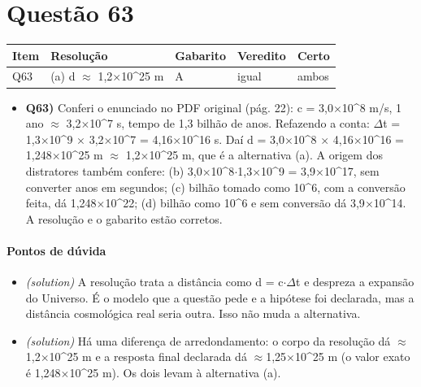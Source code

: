 \documentclass{article}%
\begin{document}
\section*{Questão 63}%
\begin{longtable}{@{}p{} p{} p{} p{} p{}@{}}\toprule Item & Resolução & Gabarito & Veredito & Certo \\ \midrule
Q63 & (a) d $\approx$ 1,2$\times$10\^{}25 m & A & igual & ambos \\
\bottomrule\end{longtable}%
\begin{itemize}%
\item%
\textbf{Q63)} Conferi o enunciado no PDF original (pág. 22): c = 3,0$\times$10\^{}8 m/s, 1 ano $\approx$ 3,2$\times$10\^{}7 s, tempo de 1,3 bilhão de anos. Refazendo a conta: $\Delta$t = 1,3$\times$10\^{}9 $\times$ 3,2$\times$10\^{}7 = 4,16$\times$10\^{}16 s. Daí d = 3,0$\times$10\^{}8 $\times$ 4,16$\times$10\^{}16 = 1,248$\times$10\^{}25 m $\approx$ 1,2$\times$10\^{}25 m, que é a alternativa (a). A origem dos distratores também confere: (b) 3,0$\times$10\^{}8$\cdot$1,3$\times$10\^{}9 = 3,9$\times$10\^{}17, sem converter anos em segundos; (c) bilhão tomado como 10\^{}6, com a conversão feita, dá 1,248$\times$10\^{}22; (d) bilhão como 10\^{}6 e sem conversão dá 3,9$\times$10\^{}14. A resolução e o gabarito estão corretos.%
\end{itemize}%
\paragraph{Pontos de dúvida}%
\begin{itemize}%
\item%
\textit{(solution)} A resolução trata a distância como d = c$\cdot$$\Delta$t e despreza a expansão do Universo. É o modelo que a questão pede e a hipótese foi declarada, mas a distância cosmológica real seria outra. Isso não muda a alternativa.%
\item%
\textit{(solution)} Há uma diferença de arredondamento: o corpo da resolução dá $\approx$1,2$\times$10\^{}25 m e a resposta final declarada dá $\approx$1,25$\times$10\^{}25 m (o valor exato é 1,248$\times$10\^{}25 m). Os dois levam à alternativa (a).%
\end{itemize}%
\end{document}
